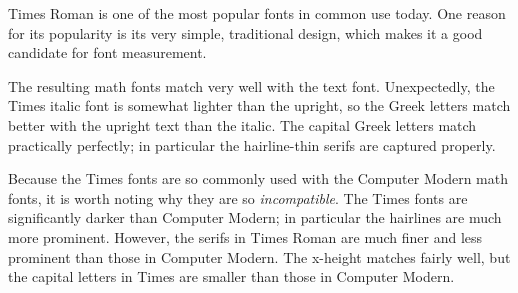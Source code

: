
Times Roman is one of the most popular fonts in common use today. One reason for
its popularity is its very simple, traditional design, which makes it a good
candidate for font measurement.

The resulting math fonts match very well with the text font. Unexpectedly, the
Times italic font is somewhat lighter than the upright, so the Greek letters
match better with the upright text than the italic. The capital Greek letters
match practically perfectly; in particular the hairline-thin serifs are captured
properly.

Because the Times fonts are so commonly used with the Computer Modern math
fonts, it is worth noting why they are so \emph{incompatible}. The Times fonts
are significantly darker than Computer Modern; in particular the hairlines are
much more prominent. However, the serifs in Times Roman are much finer and less
prominent than those in Computer Modern. The x-height matches fairly well, but
the capital letters in Times are smaller than those in Computer Modern.
